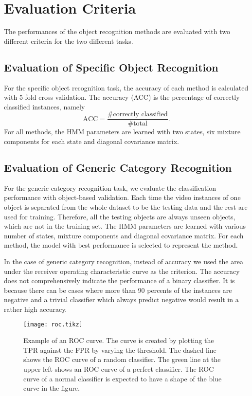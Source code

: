 \documentclass[12pt,final,twoside]{report}
\begin{document}
\section{Evaluation Criteria}
The performances of the object recognition methods are evaluated with two different criteria for the two different tasks. 
\subsection{Evaluation of Specific Object Recognition}
For the specific object recognition task, the accuracy of each method is calculated with 5-fold cross validation. The accuracy (ACC) is the percentage of correctly classified instances, namely 
\[ \text{ACC} =  \frac{\text{\# correctly classified}}{\text{\# total}} . \]
For all methods, the HMM parameters are learned with two states, six mixture components for each state and diagonal covariance matrix.

\subsection{Evaluation of Generic Category Recognition}
For the generic category recognition task, we evaluate the classification performance with object-based validation. Each time the video instances of one object is separated from the whole dataset to be the testing data and the rest are used for training. Therefore, all the testing objects are always unseen objects, which are not in the training set. The HMM parameters are learned with various number of states, mixture components and diagonal covariance matrix. For each method, the model with best performance is selected to represent the method.

In the case of generic category recognition, instead of accuracy we used the area under the receiver operating characteristic curve as the criterion. The accuracy does not comprehensively indicate the performance of a binary classifier. It is because there can be cases where more than 90 percents of the instances are negative and a trivial classifier which always predict negative would result in a rather high accuracy.

\begin{figure}[t]
  \centering
  \texttt{[image: roc.tikz]}
  \caption[Example of an ROC curve.]{Example of an ROC curve. The curve is created by plotting the TPR against the FPR by varying the threshold. The dashed line shows the ROC curve of a random classifier. The green line at the upper left shows an ROC curve of a perfect classifier. The ROC curve of a normal classifier is expected to have a shape of the blue curve in the figure.}
  \label{fig:roc}
\end{figure}
\end{document}
